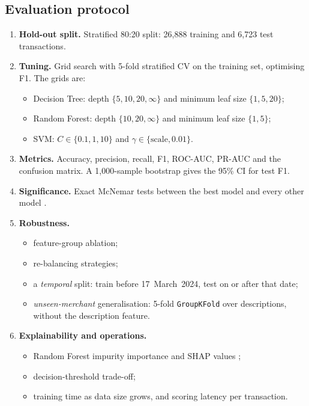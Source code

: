 \documentclass[12pt,a4paper]{article}
\begin{document}
\subsection{Evaluation protocol}
\begin{enumerate}[nosep]
\item \textbf{Hold-out split.} Stratified 80:20 split: 26{,}888 training and 6{,}723 test transactions.
\item \textbf{Tuning.} Grid search with 5-fold stratified CV on the training set, optimising F1. The grids are:
\begin{itemize}[nosep]
\item Decision Tree: depth $\{5,10,20,\infty\}$ and minimum leaf size $\{1,5,20\}$;
\item Random Forest: depth $\{10,20,\infty\}$ and minimum leaf size $\{1,5\}$;
\item SVM: $C\in\{0.1,1,10\}$ and $\gamma\in\{\text{scale},0.01\}$.
\end{itemize}
\item \textbf{Metrics.} Accuracy, precision, recall, F1, ROC-AUC, PR-AUC \citep{saito2015precision} and the confusion matrix. A 1{,}000-sample bootstrap gives the 95\% CI for test F1.
\item \textbf{Significance.} Exact McNemar tests between the best model and every other model \citep{dietterich1998approximate}.
\item \textbf{Robustness.}
\begin{itemize}[nosep]
\item feature-group ablation;
\item re-balancing strategies;
\item a \emph{temporal} split: train before 17~March~2024, test on or after that date;
\item \emph{unseen-merchant} generalisation: 5-fold \texttt{GroupKFold} over descriptions, without the description feature.
\end{itemize}
\item \textbf{Explainability and operations.}
\begin{itemize}[nosep]
\item Random Forest impurity importance and SHAP values \citep{lundberg2017unified};
\item decision-threshold trade-off;
\item training time as data size grows, and scoring latency per transaction.
\end{itemize}
\end{enumerate}
\end{document}
